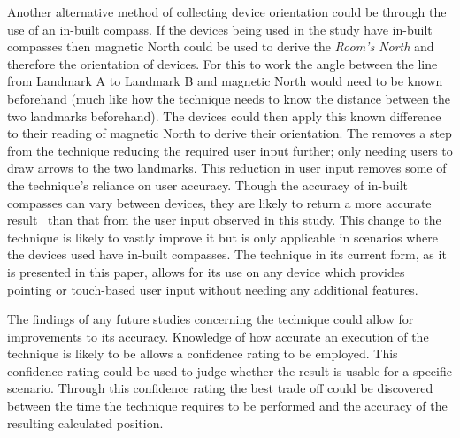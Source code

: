 \documentclass{bmcart}
\begin{document}
Another alternative method of collecting device orientation could be through the use of an in-built compass.
If the devices being used in the study have in-built compasses then magnetic North could be used to derive the \emph{Room's North} and therefore the orientation of devices.
For this to work the angle between the line from Landmark A to Landmark B and magnetic North would need to be known beforehand (much like how the technique needs to know the distance between the two landmarks beforehand).
The devices could then apply this known difference to their reading of magnetic North to derive their orientation.
The removes a step from the technique reducing the required user input further; only needing users to draw arrows to the two landmarks.
This reduction in user input removes some of the technique's reliance on user accuracy.
Though the accuracy of in-built compasses can vary between devices, they are likely to return a more accurate result~\cite{Hwang2012} than that from the user input observed in this study.
This change to the technique is likely to vastly improve it but is only applicable in scenarios where the devices used have in-built compasses.
The technique in its current form, as it is presented in this paper, allows for its use on any device which provides pointing or touch-based user input without needing any additional features.

The findings of any future studies concerning the technique could allow for improvements to its accuracy.
Knowledge of how accurate an execution of the technique is likely to be allows a confidence rating to be employed.
This confidence rating could be used to judge whether the result is usable for a specific scenario.
Through this confidence rating the best trade off could be discovered between the time the technique requires to be performed and the accuracy of the resulting calculated position.


\end{document}
